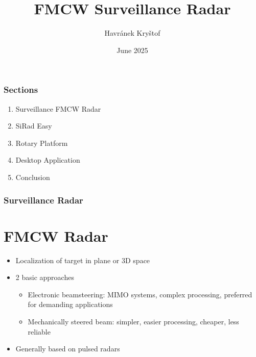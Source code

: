 \documentclass[aspectratio=169]{beamer}
\title{FMCW Surveillance Radar}
\author{Havránek Kryštof}
\date{June 2025}
\institute{České vysoké učení technické v Praze}
\begin{document}
\begin{frame}[plain]
  \maketitle
\end{frame}

\clearpage
\setcounter{framenumber}{0}

\begin{frame}[fragile]
  \frametitle{Sections}

  \begin{enumerate}
    \item Surveillance FMCW Radar
    \item SiRad Easy
    \item Rotary Platform
    \item Desktop Application
    \item Conclusion
  \end{enumerate}
\end{frame}


\begin{frame}[fragile]
  \frametitle{Surveillance Radar}
  \section{FMCW Radar}

  \begin{itemize}
    \item Localization of target in plane or 3D space
    \item 2 basic approaches
      \begin{itemize}
        \item Electronic beamsteering: MIMO systems, complex processing, preferred for demanding applications
				\item Mechanically steered beam: simpler, easier processing, cheaper, less reliable
      \end{itemize}
    \item Generally based on pulsed radars
  \end{itemize}
\end{frame}
\end{document}
